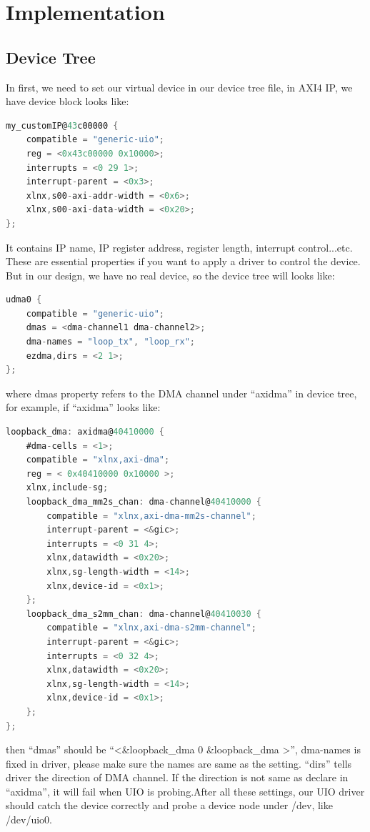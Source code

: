 
\section{Implementation}
\label{sec:Implementation}

\subsection{Device Tree}
\label{subsec:Device Tree}
In first, we need to set our virtual device in our device tree file, in AXI4 IP, we have device block looks like:
\begin{lstlisting}[frame=single,language=C]
my_customIP@43c00000 {
	compatible = "generic-uio";
	reg = <0x43c00000 0x10000>;
	interrupts = <0 29 1>;
	interrupt-parent = <0x3>;
	xlnx,s00-axi-addr-width = <0x6>;
	xlnx,s00-axi-data-width = <0x20>;
};
\end{lstlisting}
It contains IP name, IP register address, register length, interrupt control...etc. These are essential properties if you want to apply a driver to control the device. But in our design, we have no real device, so the device tree will looks like:
\begin{lstlisting}[frame=single,language=C]
udma0 {
    compatible = "generic-uio";
    dmas = <dma-channel1 dma-channel2>;
    dma-names = "loop_tx", "loop_rx";   
    ezdma,dirs = <2 1>;                 
};
\end{lstlisting}
where dmas property refers to the DMA channel under ``axidma'' in device tree, for example, if ``axidma'' looks like:
\begin{lstlisting}[frame=single,language=C]
loopback_dma: axidma@40410000 {
    #dma-cells = <1>;
    compatible = "xlnx,axi-dma";
    reg = < 0x40410000 0x10000 >;
    xlnx,include-sg;
    loopback_dma_mm2s_chan: dma-channel@40410000 {
        compatible = "xlnx,axi-dma-mm2s-channel";
        interrupt-parent = <&gic>;
        interrupts = <0 31 4>; 
        xlnx,datawidth = <0x20>;        
        xlnx,sg-length-width = <14>;    
        xlnx,device-id = <0x1>;     
    };
	loopback_dma_s2mm_chan: dma-channel@40410030 {
        compatible = "xlnx,axi-dma-s2mm-channel";
        interrupt-parent = <&gic>;
        interrupts = <0 32 4>;  
        xlnx,datawidth = <0x20>;       
        xlnx,sg-length-width = <14>;    
        xlnx,device-id = <0x1>;    
    };
};
\end{lstlisting}
then ``dmas'' should be ``<\&loopback\_dma 0 \&loopback\_dma >'', dma-names is fixed in driver, please make sure the names are same as the setting. ``dirs'' tells driver the direction of DMA channel. If the direction is not same as declare in ``axidma'', it will fail when UIO is probing.After all these settings, our UIO driver should catch the device correctly and probe a device node under /dev, like /dev/uio0.

